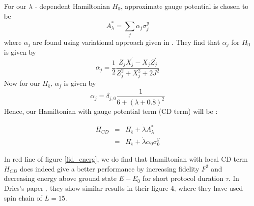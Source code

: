 \documentclass[11pt,a4paper]{article}
\begin{document}
For our $\lambda$ - dependent  Hamiltonian $H_0$, approximate gauge potential is chosen to be 
\begin{equation}
A_{\lambda}^*= \sum_j \alpha_j \sigma_j^y
\end{equation}
where $\alpha_j$ are found using variational approach given in \cite{sels2017minimizing}. They find that $\alpha_j$ for $H_0$ is given by 
\begin{equation}
\alpha_j= \dfrac{1}{2} \dfrac{Z_j X_j^{\prime}- X_j Z_j^{\prime}}{Z_j^2 + X_j^2 +2J^2}
\end{equation}
Now for our $H_b$, $\alpha_j$ is given by 
\begin{equation}
\alpha_j= \delta_{j,0} \dfrac{1}{6 + (\lambda +0.8)^2}
\end{equation}
Hence, our  Hamiltonian with gauge potential term (CD term)  will be :


\begin{eqnarray}
H_{CD}&=&H_b + \dot{\lambda} A_{\lambda}^* \\
&=&H_b + \dot{\lambda} \alpha_0 \sigma_0^y 
\end{eqnarray}

In red line of figure \ref{fid_energ}, we do find that Hamiltonian with local CD term $H_{CD}$ does indeed give a better performance by increasing fidelity $F^2$ and decreasing energy above ground state $E-E_0$ for short protocol duration $\tau$. 
In Dries's paper \cite{sels2017minimizing}, they show  similar results in their figure 4, where they have used spin chain of $L=15$.
\end{document}
